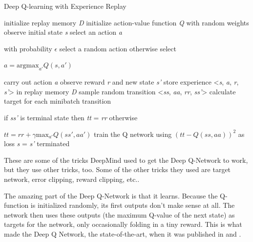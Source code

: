 \begin{algorithm}
	\caption{Deep Q-learning with Experience Replay}
	\label{algo:DQN}
	\begin{algorithmic}[]
		\State initialize replay memory \textit{D}
		\State initialize action-value function \textit{Q} with random weights
		\State observe initial state \textit{s} 
		\Repeat
			\State select an action \textit{a}
				\par with probability $\epsilon$ select a random action otherwise select 
				\par $a = \mathrm{argmax}_{a'}Q(s,a')$
		
			\State carry out action \textit{a}
			\State observe reward \textit{r} and new state \textit{s'}
			\State store experience <\textit{s}, \textit{a}, \textit{r}, \textit{s'}> in replay memory \textit{D}
			\newline
			\State sample random transition <\textit{ss}, \textit{aa}, \textit{rr}, \textit{ss'}>      
			\State calculate target for each minibatch transition
				\par if \textit{ss'} is terminal state then \textit{tt} = \textit{rr} otherwise 
				\par $tt = rr + \gamma \mathrm{max}_{a'}Q(ss',aa')$
			\State train the Q network using $(\textit{tt} - Q(\textit{ss}, \textit{aa}))^2$ as loss	
			\newline
			\State \textit{s} = \textit{s'}
		\Until terminated
	\end{algorithmic}
\end{algorithm}

These are some of the tricks DeepMind used to get the Deep Q-Network to work, but they use other tricks, too. Some of the other tricks they used are target network, error clipping, reward clipping, etc.. 

The amazing part of the Deep Q-Network is that it learns. Because the Q-function is initialized randomly, its first outputs don't make sense at all. The network then uses these outputs (the maximum Q-value of the next state) as targets for the network, only occasionally folding in a tiny reward. This is what made the Deep Q Network, the state-of-the-art, when it was published in \cite{DQN_theory} and \cite{DQN_Flappy}.
        